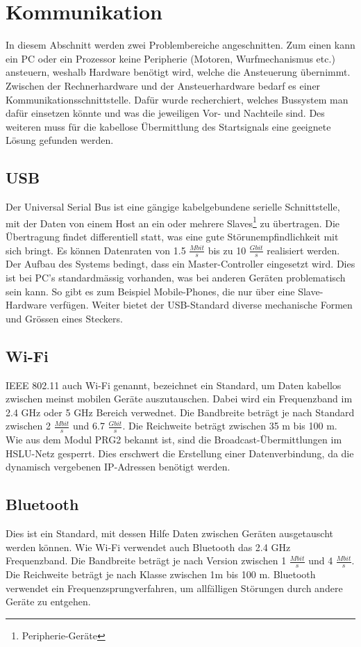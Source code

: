 ﻿\section{Kommunikation}
In diesem Abschnitt werden zwei Problembereiche angeschnitten. Zum einen kann ein PC oder ein Prozessor keine Peripherie (Motoren, Wurfmechanismus etc.) ansteuern, weshalb Hardware benötigt wird, welche die Ansteuerung übernimmt. Zwischen der Rechnerhardware und der Ansteuerhardware bedarf es einer Kommunikationsschnittstelle. Dafür wurde recherchiert, welches Bussystem man dafür einsetzen könnte und was die jeweiligen Vor- und Nachteile sind. Des weiteren muss für die kabellose Übermittlung des Startsignals eine geeignete Lösung gefunden werden.

\subsection{USB}
Der Universal Serial Bus ist eine gängige kabelgebundene serielle Schnittstelle, mit der Daten von einem Host an ein oder mehrere Slaves\footnote{Peripherie-Geräte} zu übertragen. Die Übertragung findet differentiell statt, was eine gute Störunempfindlichkeit mit sich bringt. Es können Datenraten von 1.5 $\frac{Mbit}{s}$ bis zu 10 $\frac{Gbit}{s}$ realisiert werden. Der Aufbau des Systems bedingt, dass ein Master-Controller eingesetzt wird. Dies ist bei PC's standardmässig vorhanden, was bei anderen Geräten problematisch sein kann. So gibt es zum Beispiel Mobile-Phones, die nur über eine Slave-Hardware verfügen. Weiter bietet der USB-Standard diverse mechanische Formen und Grössen eines Steckers.

\subsection{Wi-Fi}
IEEE 802.11 auch Wi-Fi genannt, bezeichnet ein Standard, um Daten kabellos zwischen meinst mobilen Geräte auszutauschen. Dabei wird ein Frequenzband im 2.4 GHz oder 5 GHz Bereich verwednet. Die Bandbreite beträgt je nach Standard zwischen 2 $\frac{Mbit}{s}$ und 6.7 $\frac{Gbit}{s}$. Die Reichweite beträgt zwischen 35 m bis 100 m. Wie aus dem Modul PRG2 bekannt ist, sind die Broadcast-Übermittlungen im HSLU-Netz gesperrt. Dies erschwert die Erstellung einer Datenverbindung, da die dynamisch vergebenen IP-Adressen benötigt werden.

\subsection{Bluetooth}
Dies ist ein Standard, mit dessen Hilfe Daten zwischen Geräten ausgetauscht werden können. Wie Wi-Fi verwendet auch Bluetooth das 2.4 GHz Frequenzband. Die Bandbreite beträgt je nach Version zwischen 1 $\frac{Mbit}{s}$ und 4 $\frac{Mbit}{s}$. Die Reichweite beträgt je nach Klasse zwischen 1m bis 100 m. Bluetooth verwendet ein Frequenzsprungverfahren, um allfälligen Störungen durch andere Geräte zu entgehen.